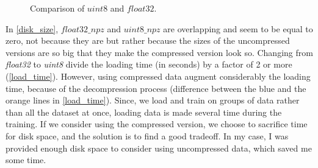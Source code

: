 \documentclass[12pt, a4paper]{report}
\begin{document}
		\begin{figure}[h!]
			\centering
			\hfill
			\vfill
			\caption{Comparison of $uint8$ and $float32$.}
			\label{dtypes}
		\end{figure}
		In \ref{disk_size}, $float32\_npz$ and $uint8\_npz$ are overlapping and seem to be equal to zero, not because they are but rather because the sizes of the uncompressed versions are so big that they make the compressed version look so.
		Changing from {\itshape float32} to {\itshape uint8} divide the loading time (in seconds) by a factor of 2 or more (\ref{load_time}).
		However, using compressed data augment considerably the loading time, because of the decompression process (difference between the blue and the orange lines in \ref{load_time}).
		Since, we load and train on groups of data rather than all the dataset at once, loading data is made several time during the training.
		If we consider using the compressed version, we choose to sacrifice time for disk space, and the solution is to find a good tradeoff.
		In my case, I was provided enough disk space to consider using uncompressed data, which saved me some time.
\end{document}

